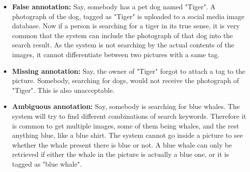 \documentclass[english]{tktltiki}
\begin{document}
\begin{itemize}
	\item \textbf{False annotation: }Say, somebody has a pet dog named "Tiger". A photograph of the dog, tagged as "Tiger" is uploaded to a social media image database. Now if a person is searching for a tiger in its true sense, it is very common that the system can include the photograph of that dog into the search result. As the system is not searching by the actual contents of the images, it cannot differentiate between two pictures with a same tag.
	\item \textbf{Missing annotation: }Say, the owner of "Tiger" forgot to attach a tag to the picture. Somebody, searching for dogs, would not receive the photograph of "Tiger". This is also unacceptable.
	\item \textbf{Ambiguous annotation: }Say, somebody is searching for blue whales. The system will try to find different combinations of search keywords. Therefore it is common to get multiple images, some of them being whales, and the rest anything blue, like a blue shirt. The system cannot go inside a picture to see whether the whale present there is blue or not. A blue whale can only be retrieved if either the whale in the picture is actually a blue one, or it is tagged as "blue whale".
\end{itemize}
\end{document}
